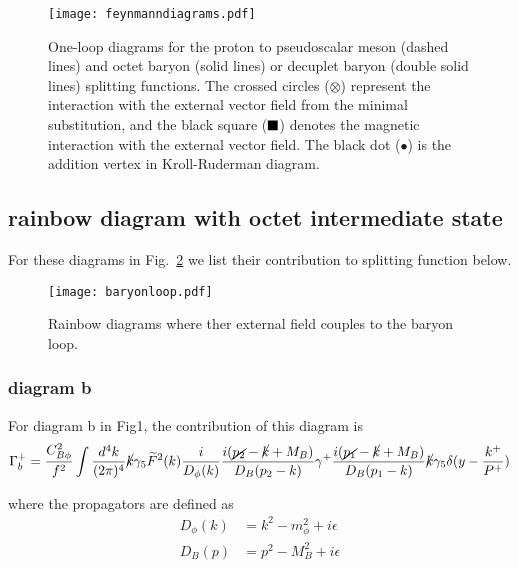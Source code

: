 \documentclass[preprintnumbers,prd,superscriptaddress,preprint]{revtex4-1}
\begin{document}
	\begin{figure}[H]
		\begin{center}
			\texttt{[image: feynmanndiagrams.pdf]}
			\caption{One-loop diagrams for the proton to pseudoscalar meson (dashed lines) and octet baryon (solid lines) or decuplet baryon (double solid lines) splitting functions. The crossed circles ($\otimes$) represent the interaction with the external vector field from the minimal substitution, and the black square (${\textcolor{black}{\blacksquare}}$) denotes the magnetic interaction with the external vector field. The black dot ($\bullet$) is the addition vertex in Kroll-Ruderman diagram.} 
			\label{fig:diagrams}
		\end{center}
	\end{figure}
	
	\subsection{rainbow diagram with octet intermediate state}
	For these diagrams in Fig.~\ref{fig:rainbowdiagrams} we list their contribution to splitting function below.
	
	\begin{figure}[htbp]
		\begin{center}
			\texttt{[image: baryonloop.pdf]}
			\caption{Rainbow diagrams where ther external field couples to the baryon loop.} 
			\label{fig:rainbowdiagrams}
		\end{center}
	\end{figure}
	
	\subsubsection{diagram b}
	
	For diagram b in Fig1, the contribution of this diagram is 
	\begin{align}
		\Gamma_{b}^{+}=\frac{C_{B\phi}^{2}}{f^{2}}\int\frac{d^{4}k}{(2\pi)^{4}}\cancel{k}\gamma_{5}\widetilde{F}^{2}(k)\frac{i}{D_{\phi}(k)}\frac{i(\cancel{p_{2}}-\cancel{k}+M_{B})}{D_{B}(p_{2}-k)}\gamma^{+}\frac{i(\cancel{p_{1}}-\cancel{k}+M_{B})}{D_{B}(p_{1}-k)}\cancel{k}\gamma_{5}\delta(y-\frac{k^{+}}{P^{+}})   
	\end{align}
	
	
	where the propagators are defined as 
	\begin{align*}
		D_{\phi}(k) & =k^{2}-m_{\phi}^{2}+i\epsilon\\
		D_{B}(p) & =p^{2}-M_{B}^{2}+i\epsilon
	\end{align*}
	
\end{document}
